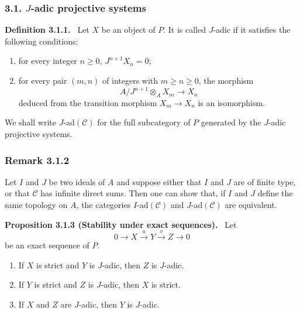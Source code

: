 \documentclass[11pt]{article}
\newenvironment{statement}[1]{\par\medskip\noindent\textbf{#1.}\ }{\par\medskip}
\providecommand{\cC}{\mathcal C}
\providecommand{\cC}{\mathcal C}
\begin{document}
\subsubsection*{3.1. $J$-adic projective systems}\label{sga5:V:subsubsection:3.1}
\label{sga5:V:definition:3.1.1}\begin{statement}{Definition 3.1.1}
Let $X$ be an object of $P$. It is called $J$-adic if it satisfies the following conditions:
\begin{enumerate}[label=(\roman*)]
\item for every integer $n\ge0$, $J^{n+1}X_n=0$;
\item for every pair $(m,n)$ of integers with $m\ge n\ge0$, the morphism
\[
A/J^{n+1}\otimes_A X_m\longrightarrow X_n
\]
deduced from the transition morphism $X_m\to X_n$ is an isomorphism.
\end{enumerate}
\end{statement}
We shall write $J$-ad$(\cC)$ for the full subcategory of $P$ generated by the $J$-adic projective systems.

\subsubsection*{Remark 3.1.2}\label{sga5:V:remark:3.1.2}
Let $I$ and $J$ be two ideals of $A$ and suppose either that $I$ and $J$ are of finite type, or that $\cC$ has infinite direct sums. Then one can show that, if $I$ and $J$ define the same topology on $A$, the categories $I$-ad$(\cC)$ and $J$-ad$(\cC)$ are equivalent.

\label{sga5:V:proposition:3.1.3}\begin{statement}{Proposition 3.1.3 (Stability under exact sequences)}
Let
\[
0\longrightarrow X\stackrel{u}{\longrightarrow}Y\stackrel{v}{\longrightarrow}Z\longrightarrow0
\]
be an exact sequence of $P$.
\begin{enumerate}[label=(\roman*)]
\item If $X$ is strict and $Y$ is $J$-adic, then $Z$ is $J$-adic.
\item If $Y$ is strict and $Z$ is $J$-adic, then $X$ is strict.
\item If $X$ and $Z$ are $J$-adic, then $Y$ is $J$-adic.
\end{enumerate}
\end{statement}
\end{document}
